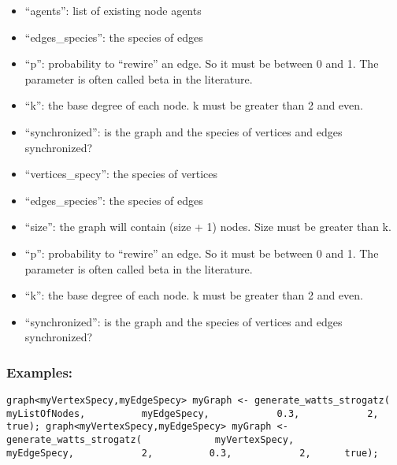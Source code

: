\documentclass[]{book}
\providecommand{\tightlist}{%
  \setlength{\itemsep}{0pt}\setlength{\parskip}{0pt}}
\theoremstyle{definition}
\theoremstyle{definition}
\theoremstyle{definition}
\theoremstyle{remark}
\begin{document}
\begin{itemize}
\tightlist
\item
  ``agents'': list of existing node agents\\
\item
  ``edges\_species'': the species of edges\\
\item
  ``p'': probability to ``rewire'' an edge. So it must be between 0 and
  1. The parameter is often called beta in the literature.\\
\item
  ``k'': the base degree of each node. k must be greater than 2 and
  even.\\
\item
  ``synchronized'': is the graph and the species of vertices and edges
  synchronized?\\
\item
  ``vertices\_specy'': the species of vertices\\
\item
  ``edges\_species'': the species of edges\\
\item
  ``size'': the graph will contain (size + 1) nodes. Size must be
  greater than k.\\
\item
  ``p'': probability to ``rewire'' an edge. So it must be between 0 and
  1. The parameter is often called beta in the literature.\\
\item
  ``k'': the base degree of each node. k must be greater than 2 and
  even.\\
\item
  ``synchronized'': is the graph and the species of vertices and edges
  synchronized?
\end{itemize}

\subsubsection{Examples:}\label{examples-138}

\begin{verbatim}
graph<myVertexSpecy,myEdgeSpecy> myGraph <- generate_watts_strogatz(            myListOfNodes,          myEdgeSpecy,            0.3,            2,      true); graph<myVertexSpecy,myEdgeSpecy> myGraph <- generate_watts_strogatz(             myVertexSpecy,          myEdgeSpecy,            2,          0.3,            2,      true); 
\end{verbatim}
\end{document}

